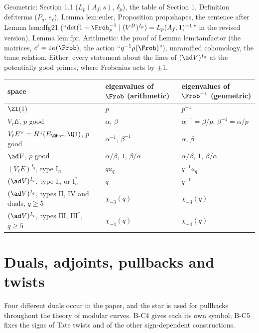\begin{warning}\label{warn:notation:which-frobenius}
Geometric: Section 1.1 ($L_p(A_f,s)$, $\delta_p$), the table of Section 1, Definition def:terms ($P_q$, $e_\ell$), Lemma lem:euler,
Proposition prop:shapes, the sentence after Lemma lem:dfg21 (``$\det(1-\Frob_p^{-1}\mid(V^D)^{I_p})=L_p(A_f,1)^{-1}$'' in the revised
version), Lemma lem:fpr. Arithmetic: the proof of Lemma lem:tamfactor (the matrices, $c'=\varepsilon\kappa(\Frob)$, the action
``$q^{-1}\rho(\Frob)$''), unramified cohomology, the tame relation. Either: every statement about the lines
of $(\ad V)^{I_q}$ at the potentially good primes, where Frobenius acts by $\pm1$.
\end{warning}

\begin{center}\small
\begin{tabular}{@{}p{3.9cm}p{4.5cm}p{4.5cm}@{}}
\toprule
space & eigenvalues of $\Frob$ (arithmetic) & eigenvalues of $\Frob^{-1}$ (geometric)\\
\midrule
$\Zl(1)$ & $p$ & $p^{-1}$\\
$V_\ell E$, $p$ good & $\alpha$, $\beta$ & $\alpha^{-1}=\beta/p$, $\beta^{-1}=\alpha/p$\\
$V_\ell E^\vee=H^1(E_{\Qbar},\Ql)$, $p$ good & $\alpha^{-1}$, $\beta^{-1}$ & $\alpha$, $\beta$\\
$\ad V$, $p$ good & $\alpha/\beta$, $1$, $\beta/\alpha$ & $\alpha/\beta$, $1$, $\beta/\alpha$\\
$(V_\ell E)^{I_q}$, type $\mathrm I_n$ & $qa_q$ & $q^{-1}a_q$\\
$(\ad V)^{I_q}$, type $\mathrm I_n$ or $\mathrm I_n^*$ & $q$ & $q^{-1}$\\
$(\ad V)^{I_q}$, types $\mathrm{II}$, $\mathrm{IV}$ and duals, $q\ge5$ & $\chi_{-3}(q)$ & $\chi_{-3}(q)$\\
$(\ad V)^{I_q}$, types $\mathrm{III}$, $\mathrm{III}^*$, $q\ge5$ & $\chi_{-4}(q)$ & $\chi_{-4}(q)$\\
\bottomrule
\end{tabular}
\end{center}

\section{Duals, adjoints, pullbacks and twists}\label{sec:notation:duals}

Four different duals occur in the paper, and the star is used for pullbacks throughout the theory of modular curves. B-C4 gives
each its own symbol; B-C5 fixes the signs of Tate twists and of the other sign-dependent constructions.

